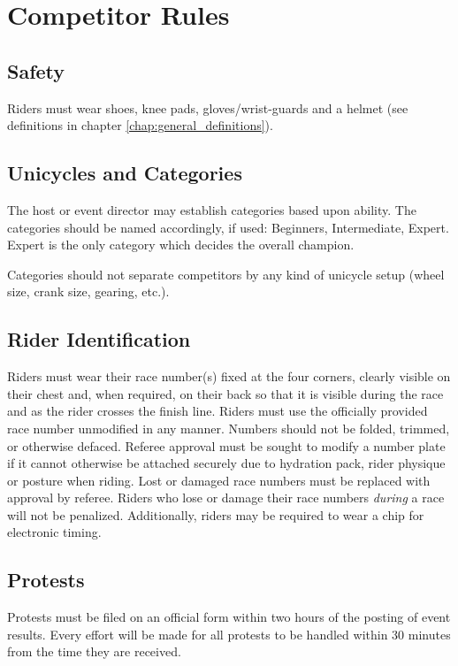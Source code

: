 \chapter{Competitor Rules}

\section{Safety}
Riders must wear shoes, knee pads, gloves/wrist-guards and a helmet (see definitions in chapter \ref{chap:general_definitions}).

\section{Unicycles and Categories}

The host or event director may establish categories based upon ability.
The categories should be named accordingly, if used: Beginners, Intermediate, Expert.
Expert is the only category which decides the overall champion.

Categories should not separate competitors by any kind of unicycle setup (wheel size, crank size, gearing, etc.).

\section{Rider Identification}

Riders must wear their race number(s) fixed at the four corners, clearly visible on their chest and, when required, on their back so that it is visible during the race and as the rider crosses the finish line.
Riders must use the officially provided race number unmodified in any manner.
Numbers should not be folded, trimmed, or otherwise defaced.
Referee approval must be sought to modify a number plate if it cannot otherwise be attached securely due to hydration pack, rider physique or posture when riding.
Lost or damaged race numbers must be replaced with approval by referee.
Riders who lose or damage their race numbers \textit{during} a race will not be penalized.
Additionally, riders may be required to wear a chip for electronic timing.

\section{Protests}

Protests must be filed on an official form within two hours of the posting of event results.
Every effort will be made for all protests to be handled within 30 minutes from the time they are received.

